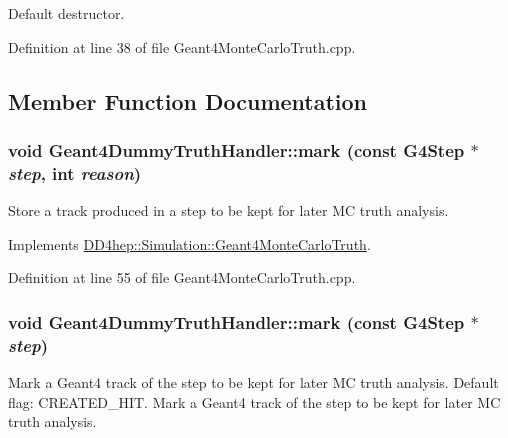 Default destructor. 

Definition at line 38 of file Geant4MonteCarloTruth.cpp.

\subsection{Member Function Documentation}
\hypertarget{class_d_d4hep_1_1_simulation_1_1_geant4_dummy_truth_handler_a0387d2cf651a83c45242962f80c41096}{
\subsubsection[{mark}]{\setlength{\rightskip}{0pt plus 5cm}void Geant4DummyTruthHandler::mark (const G4Step $\ast$ {\em step}, \/  int {\em reason})}}
\label{class_d_d4hep_1_1_simulation_1_1_geant4_dummy_truth_handler_a0387d2cf651a83c45242962f80c41096}


Store a track produced in a step to be kept for later MC truth analysis. 

Implements \hyperlink{class_d_d4hep_1_1_simulation_1_1_geant4_monte_carlo_truth_aaa3fb07338363616c0a898d791d24314}{DD4hep::Simulation::Geant4MonteCarloTruth}.

Definition at line 55 of file Geant4MonteCarloTruth.cpp.\hypertarget{class_d_d4hep_1_1_simulation_1_1_geant4_dummy_truth_handler_a19f10fada0444ae5f60deb1d92761969}{
\subsubsection[{mark}]{\setlength{\rightskip}{0pt plus 5cm}void Geant4DummyTruthHandler::mark (const G4Step $\ast$ {\em step})}}
\label{class_d_d4hep_1_1_simulation_1_1_geant4_dummy_truth_handler_a19f10fada0444ae5f60deb1d92761969}


Mark a Geant4 track of the step to be kept for later MC truth analysis. Default flag: CREATED\_\-HIT. Mark a Geant4 track of the step to be kept for later MC truth analysis. 

